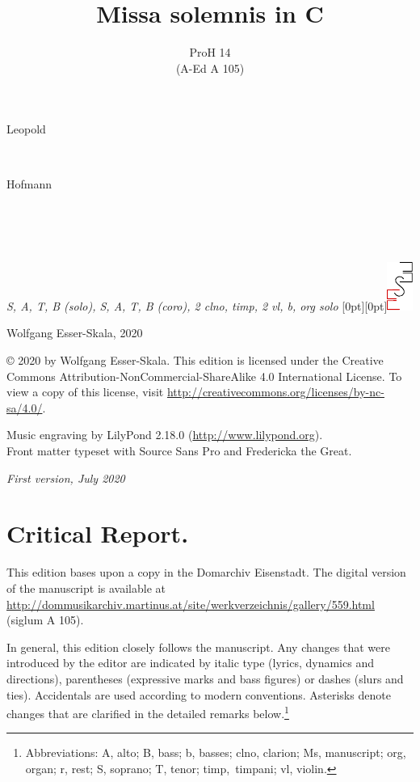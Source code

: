 \documentclass[parskip=full]{scrreprt}
\makeatletter
\DeclareRobustCommand{\sbseries}{\fontseries{sb}\selectfont}
\newcommand\fancytitlehead{
	\headingfont%
	\fontsize{80}{80}\selectfont\textcolor{black!80}{\@ifundefined{@shortname}{\@lastname}{\@shortname}.}\\[15pt]%
	\fontsize{60}{60}\selectfont\@ifundefined{@shorttitle}{\@title}{\@shorttitle}.%
}
\def\firstname#1{\def\@firstname{#1}}
\def\lastname#1{\def\@lastname{#1}}
\def\shorttitle#1{\def\@shorttitle{#1}}
\def\instrumentation#1{\def\@instrumentation{#1}}
\def\maketitle{%
\begin{titlepage}%
	\Large%
	{\@titlehead}%
	\vfill%
	{\strut\@firstname}\\%
	{\sbseries\color{oldred}\strut\@lastname}\\%
	{\strut\@namesuffix}%
	\vfill%
	{\sbseries\@title}\\%
	{\@subtitle}\\[\baselineskip]%
	{\itshape\@instrumentation}%
	\vfill%
	{\itshape\@parts}\hspace*{\fill}\raisebox{0pt}[0pt][0pt]{\includegraphics{ees_logo}}%
\end{titlepage}%
}
\newif\ifprintreport\printreportfalse
\makeatother
\begin{document}
\frenchspacing

\titlehead{\fancytitlehead}
\firstname{Leopold}
\lastname{Hofmann}
\title{Missa solemnis in C}
\shorttitle{Missa solemnis}
\subtitle{ProH 14\\(A-Ed A 105)}
\instrumentation{S, A, T, B (solo), S, A, T, B (coro), 2 clno, timp, 2 vl, b, org solo}
\maketitle


\thispagestyle{empty}

\vspace*{\fill}

\hspace*{1em}Wolfgang Esser-Skala, 2020

© 2020 by Wolfgang Esser-Skala. This edition is licensed under the Creative Commons Attribution-NonCommercial-ShareAlike 4.0 International License. To view a copy of this license, visit \url{http://creativecommons.org/licenses/by-nc-sa/4.0/}. 

Music engraving by LilyPond 2.18.0 (\url{http://www.lilypond.org}).\\
Front matter typeset with Source Sans Pro and Fredericka the Great.

\textit{First version, July 2020}

\vspace*{2cm}

\ifprintreport
\chapter*{Critical Report.}

This edition bases upon a copy in the Domarchiv Eisenstadt. The digital version of the manuscript is available at \url{http://dommusikarchiv.martinus.at/site/werkverzeichnis/gallery/559.html} (siglum A 105).

In general, this edition closely follows the manuscript. Any changes that were introduced by the editor are indicated by italic type (lyrics, dynamics and directions), parentheses (expressive marks and bass figures) or dashes (slurs and ties). Accidentals are used according to modern conventions. Asterisks denote changes that are clarified in the detailed remarks below.\footnote{Abbreviations: A, alto; B, bass; b, basses; clno, clarion; Ms, manuscript; org, organ; r, rest; S, soprano; T, tenor; timp,~timpani; vl, violin.}
\end{document}

